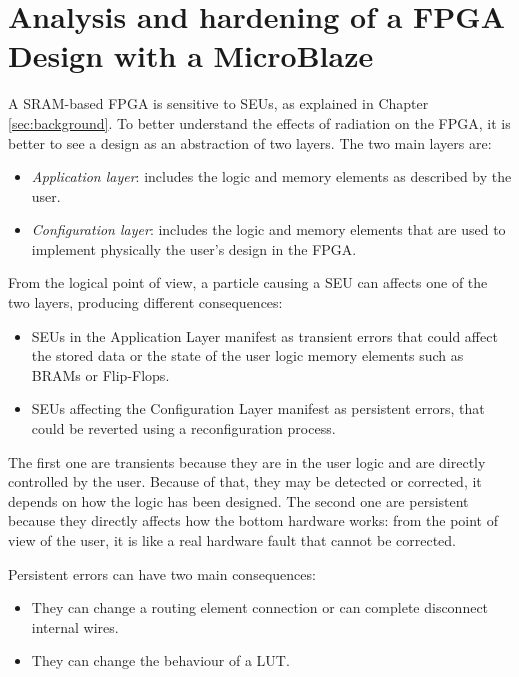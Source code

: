 \chapter{Analysis and hardening of a FPGA Design with a MicroBlaze}

A SRAM-based FPGA is sensitive to SEUs, as explained in Chapter \ref{sec:background}. To better understand the effects of radiation on the FPGA, it is better to see a design as an abstraction of two layers. The two main layers are:

\begin{itemize}
    \item \textit{Application layer}: includes the logic and memory elements as described by the user.
    \item \textit{Configuration layer}: includes the logic and memory elements that are used to implement physically the user's design in the FPGA.
\end{itemize}

From the logical point of view, a particle causing a SEU can affects one of the two layers, producing different consequences:

\begin{itemize}
    \item SEUs in the Application Layer manifest as transient errors that could affect the stored data or the state of the user logic memory elements such as BRAMs or Flip-Flops. 
    \item SEUs affecting the Configuration Layer manifest as persistent errors, that could be reverted using a reconfiguration process. 
\end{itemize}

The first one are transients because they are in the user logic and are directly controlled by the user. Because of that, they may be detected or corrected, it depends on how the logic has been designed. The second one are persistent because they directly affects how the bottom hardware works: from the point of view of the user, it is like a real hardware fault that cannot be corrected. \bigskip

Persistent errors can have two main consequences:

\begin{itemize}
    \item They can change a routing element connection or can complete disconnect internal wires.
    \item They can change the behaviour of a LUT.
\end{itemize}

